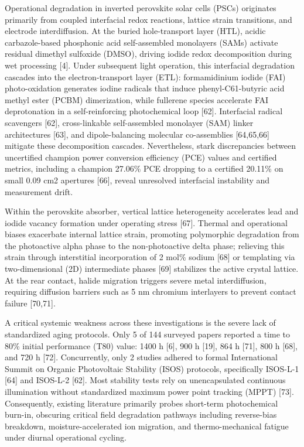 \documentclass[
  11pt,
]{article}
\begin{document}
Operational degradation in inverted perovskite solar cells (PSCs)
originates primarily from coupled interfacial redox reactions, lattice
strain transitions, and electrode interdiffusion. At the buried
hole-transport layer (HTL), acidic carbazole-based phosphonic acid
self-assembled monolayers (SAMs) activate residual dimethyl sulfoxide
(DMSO), driving iodide redox decomposition during wet processing
{[}4{]}. Under subsequent light operation, this interfacial degradation
cascades into the electron-transport layer (ETL): formamidinium iodide
(FAI) photo-oxidation generates iodine radicals that induce
phenyl-C61-butyric acid methyl ester (PCBM) dimerization, while
fullerene species accelerate FAI deprotonation in a self-reinforcing
photochemical loop {[}62{]}. Interfacial radical scavengers {[}62{]},
cross-linkable self-assembled monolayer (SAM) linker architectures
{[}63{]}, and dipole-balancing molecular co-assemblies {[}64,65,66{]}
mitigate these decomposition cascades. Nevertheless, stark discrepancies
between uncertified champion power conversion efficiency (PCE) values
and certified metrics, including a champion 27.06\% PCE dropping to a
certified 20.11\% on small 0.09 cm2 apertures {[}66{]}, reveal
unresolved interfacial instability and measurement drift.

Within the perovskite absorber, vertical lattice heterogeneity
accelerates lead and iodide vacancy formation under operating stress
{[}67{]}. Thermal and operational biases exacerbate internal lattice
strain, promoting polymorphic degradation from the photoactive alpha
phase to the non-photoactive delta phase; relieving this strain through
interstitial incorporation of 2 mol\% sodium {[}68{]} or templating via
two-dimensional (2D) intermediate phases {[}69{]} stabilizes the active
crystal lattice. At the rear contact, halide migration triggers severe
metal interdiffusion, requiring diffusion barriers such as 5 nm chromium
interlayers to prevent contact failure {[}70,71{]}.

A critical systemic weakness across these investigations is the severe
lack of standardized aging protocols. Only 5 of 144 surveyed papers
reported a time to 80\% initial performance (T80) value: 1400 h {[}6{]},
900 h {[}19{]}, 864 h {[}71{]}, 800 h {[}68{]}, and 720 h {[}72{]}.
Concurrently, only 2 studies adhered to formal International Summit on
Organic Photovoltaic Stability (ISOS) protocols, specifically ISOS-L-1
{[}64{]} and ISOS-L-2 {[}62{]}. Most stability tests rely on
unencapsulated continuous illumination without standardized maximum
power point tracking (MPPT) {[}73{]}. Consequently, existing literature
primarily probes short-term photochemical burn-in, obscuring critical
field degradation pathways including reverse-bias breakdown,
moisture-accelerated ion migration, and thermo-mechanical fatigue under
diurnal operational cycling.
\end{document}
